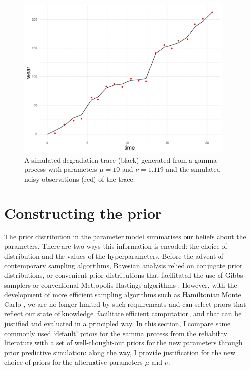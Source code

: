 \begin{figure}[tbp]
  \centering
  \includegraphics[width=0.95\textwidth]{./figures/ch-4/SimData.pdf}
  \caption{A simulated degradation trace (black) generated from a gamma process with parameters $\mu = 10$ and $\nu = 1.119$ and the simulated noisy observations (red) of the trace.}
  \label{fig:sim-data}
\end{figure}

\section{Constructing the prior} \label{sec:GP_priors}

The prior distribution in the parameter model summarises our beliefs about the parameters. There are two ways this information is encoded: the choice of distribution and the values of the hyperparameters. Before the advent of contemporary sampling algorithms, Bayesian analysis relied on conjugate prior distributions, or convenient prior distributions that facilitated the use of Gibbs samplers or conventional Metropolis-Hastings algorithms \citep{gilks_1996}. However, with the development of more efficient sampling algorithms such as Hamiltonian Monte Carlo \citep{betancourt_2017}, we are no longer limited by such requirements and can select priors that reflect our state of knowledge, facilitate efficient computation, and that can be justified and evaluated in a principled way. In this section, I compare some commonly used `default' priors for the gamma process from the reliability literature with a set of well-thought-out priors for the new parameters through prior predictive simulation: along the way, I provide justification for the new choice of priors for the alternative parameters $\mu$ and $\nu$.

